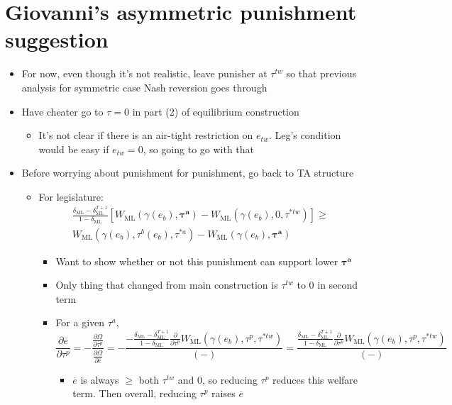 \documentclass[12pt]{article}
\newcommand{\ov}{\overline}
\newcommand{\bta}{\bm{\tau^a}}
\newcommand{\ga}{\gamma}
\newcommand{\de}{\delta}
\begin{document}
\newpage
\section{Giovanni's asymmetric punishment suggestion}
\begin{itemize}
	\item For now, even though it's not realistic, leave punisher at $\tau^{tw}$ so that previous analysis for symmetric case Nash reversion goes through
	\item Have cheater go to $\tau = 0$ in part (2) of equilibrium construction
		\begin{itemize}
			\item It's not clear if there is an air-tight restriction on $e_{tw}$. Leg's condition would be easy if $e_{tw} = 0$, so going to go with that
		\end{itemize}
	\item Before worrying about punishment for punishment, go back to TA structure
		\begin{itemize}
			\item For legislature:
				\begin{multline}
  \frac{\de_\text{ML} - \de_\text{ML}^{T+1}}{1-\de_\text{ML}} \left[W_\text{ML}(\ga(e_b),\bta) - W_{\text{ML}}(\ga(e_b),0,\tau^{*tw}) \right] \geq \\
	W_{\text{ML}}(\ga(e_b),\tau^b(e_b),\tau^{*a}) - W_{\text{ML}}(\ga(e_b),\bta)
				\end{multline}
				\begin{itemize}
					\item Want to show whether or not this punishment can support lower $\bta$
					\item Only thing that changed from main construction is $\tau^{tw}$ to 0 in second term
					\item For a given $\tau^a$,
						\[
						  \frac{\partial \ov{e}}{\partial \tau^p} = -\frac{\frac{\partial \Omega}{\partial \tau^p}}{\frac{\partial \Omega}{\partial \ov{e}}} = -\frac{-\frac{\de_\text{ML} - \de_\text{ML}^{T+1}}{1-\de_\text{ML}}\frac{\partial }{\partial \tau^p} W_{\text{ML}}(\ga(e_b),\tau^p,\tau^{*tw}) }{(-)} = \frac{\frac{\de_\text{ML} - \de_\text{ML}^{T+1}}{1-\de_\text{ML}}\frac{\partial }{\partial \tau^p} W_{\text{ML}}(\ga(e_b),\tau^p,\tau^{*tw}) }{(-)}
						\]
							\begin{itemize}
								\item $\ov{e}$ is always $\geq$ both $\tau^{tw}$ and 0, so reducing $\tau^p$ reduces this welfare term. Then overall, reducing $\tau^p$ raises $\ov{e}$

\end{itemize}
\end{itemize}
\end{itemize}
\end{itemize}
\end{document}
